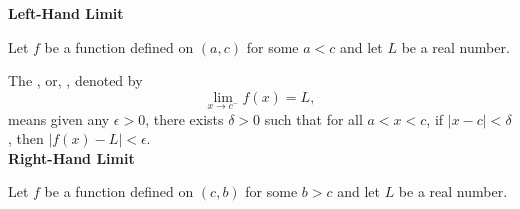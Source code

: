 %
\enlargethispage{3\baselineskip}
{%
\textbf{Left-Hand Limit} 

\indent Let $f$ be a function defined on $(a,c)$ for some $a<c$ and let $L$ be a real number. 

The , or, , denoted by  
$$\displaystyle \lim_{x\rightarrow c^-} f(x) = L,$$
means  given any $\epsilon > 0$, there exists $\delta > 0$ such that for all $a<x<c$,  
if  $|x - c| < \delta$, then $|f(x) - L| < \epsilon$.\\


\textbf{Right-Hand Limit}

\indent Let $f$ be a function defined on $(c,b)$ for some $b>c$ and let $L$ be a real number. 

}
